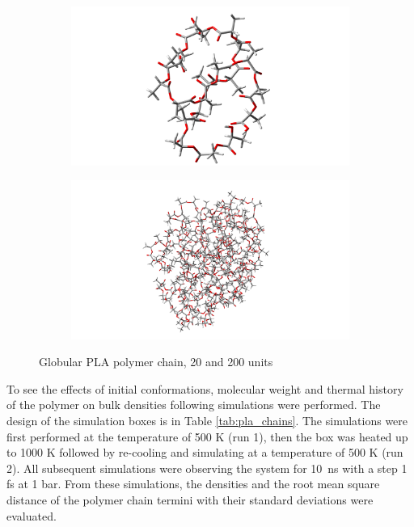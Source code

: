 \begin{figure}[htb]
	\begin{subfigure}{0.5\textwidth}
		\includegraphics[width=0.9\linewidth]{img/pla_10g_tube.png} 
	\end{subfigure}
	\begin{subfigure}{0.5\textwidth}
		\includegraphics[width=0.9\linewidth]{img/pla_100g_tube.png} 
	\end{subfigure}   	
	\caption{Globular PLA polymer chain, 20 and 200 units}
	\label{fig:sbalene}
\end{figure}\vspace{-0.2cm}

To see the effects of initial conformations, molecular weight and thermal history of the polymer on bulk densities following simulations were performed. The design of the simulation boxes is in Table \ref{tab:pla_chains}. The simulations were first performed at the temperature of 500 K (run 1), then the box was heated up to 1000 K followed by re-cooling and simulating at a temperature of 500 K (run 2). All subsequent simulations were observing the system for 10~ns with a step 1 fs at 1 bar. From these simulations, the densities and the root mean square distance of the polymer chain termini with their standard deviations were evaluated.

